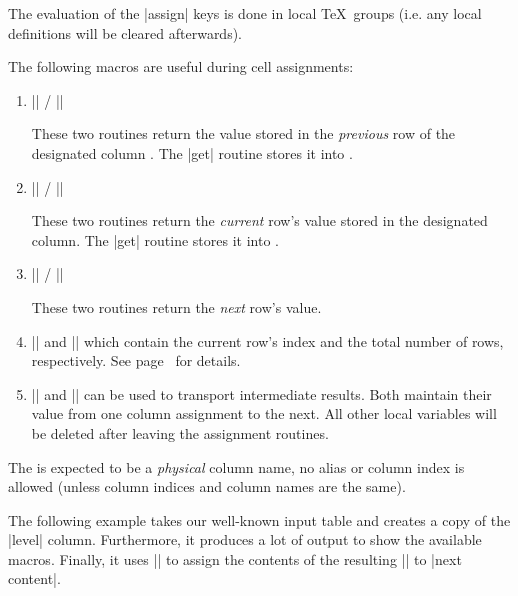 \begin{command}{\pgfplotstablecreatecol{}}
The evaluation of the |assign| keys is done in local \TeX\ groups (i.e. any local definitions will be cleared afterwards).

The following macros are useful during cell assignments:
\begin{enumerate}
	\item |\prevrow| / |\getprevrow|

	These two routines return the value stored in the \emph{previous} row of the designated column . The |get| routine stores it into .

	\item |\thisrow| / |\getthisrow|

	These two routines return the \emph{current} row's value stored in the designated column. The |get| routine stores it into .

	\item |\nextrow| / |\getnextrow|

	These two routines return the \emph{next} row's value.

	\item |\pgfplotstablerow| and |\pgfplotstablerows| which contain the current row's index and the total number of rows, respectively. See page~\pageref{pgfplotstable:page:tablerow} for details.
	\item |\pgfmathaccuma| and |\pgfmathaccumb| can be used to transport intermediate results.
	Both maintain their value from one column assignment to the next. All other local variables will be deleted after leaving the assignment routines.
\end{enumerate}
The  is expected to be a \emph{physical} column name, no alias or column index is allowed (unless column indices and column names are the same).

The following example takes our well-known input table and creates a copy of the |level| column. Furthermore, it produces a lot of output to show the available macros. Finally, it uses |\pgfkeyslet| to assign the contents of the resulting |\entry| to |next content|.
\begin{codeexample}[]
\table
{}\table


\end{codeexample}
\end{command}
